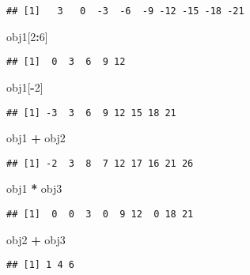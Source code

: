 \documentclass[
]{article}
\newenvironment{Shaded}{\begin{snugshade}}{\end{snugshade}}
\newcommand{\DecValTok}[1]{\textcolor[rgb]{0.00,0.00,0.81}{#1}}
\newcommand{\NormalTok}[1]{#1}
\newcommand{\SpecialCharTok}[1]{\textcolor[rgb]{0.81,0.36,0.00}{\textbf{#1}}}
\begin{document}
\begin{verbatim}
## [1]   3   0  -3  -6  -9 -12 -15 -18 -21
\end{verbatim}

\begin{Shaded}
\begin{Highlighting}[]
\NormalTok{obj1[}\DecValTok{2}\SpecialCharTok{:}\DecValTok{6}\NormalTok{]}
\end{Highlighting}
\end{Shaded}

\begin{verbatim}
## [1]  0  3  6  9 12
\end{verbatim}

\begin{Shaded}
\begin{Highlighting}[]
\NormalTok{obj1[}\SpecialCharTok{{-}}\DecValTok{2}\NormalTok{]}
\end{Highlighting}
\end{Shaded}

\begin{verbatim}
## [1] -3  3  6  9 12 15 18 21
\end{verbatim}

\begin{Shaded}
\begin{Highlighting}[]
\NormalTok{obj1 }\SpecialCharTok{+}\NormalTok{ obj2}
\end{Highlighting}
\end{Shaded}

\begin{verbatim}
## [1] -2  3  8  7 12 17 16 21 26
\end{verbatim}

\begin{Shaded}
\begin{Highlighting}[]
\NormalTok{obj1 }\SpecialCharTok{*}\NormalTok{ obj3}
\end{Highlighting}
\end{Shaded}

\begin{verbatim}
## [1]  0  0  3  0  9 12  0 18 21
\end{verbatim}

\begin{Shaded}
\begin{Highlighting}[]
\NormalTok{obj2 }\SpecialCharTok{+}\NormalTok{ obj3}
\end{Highlighting}
\end{Shaded}

\begin{verbatim}
## [1] 1 4 6
\end{verbatim}
\end{document}
